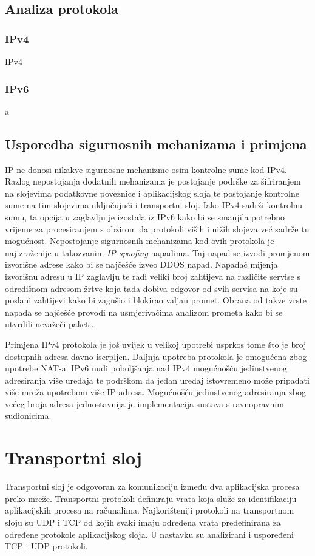 \documentclass[times, utf8, diplomski]{fer}
\begin{document}
\subsection{Analiza protokola}
\subsubsection{IPv4}
IPv4 

\subsubsection{IPv6}
a

\subsection{Usporedba sigurnosnih mehanizama i primjena}
IP ne donosi nikakve sigurnosne mehanizme osim kontrolne sume kod IPv4. Razlog nepostojanja dodatnih mehanizama je postojanje podrške za šifriranjem na slojevima podatkovne poveznice i aplikacijskog sloja te postojanje kontrolne sume na tim slojevima uključujući i transportni sloj. Iako IPv4 sadrži kontrolnu sumu, ta opcija u zaglavlju je izostala iz IPv6 kako bi se smanjila potrebno vrijeme za procesiranjem s obzirom da protokoli viših i nižih slojeva već sadrže tu mogućnost. Nepostojanje sigurnosnih mehanizama kod ovih protokola je najizraženije u takozvanim \emph{IP spoofing} napadima. Taj napad se izvodi promjenom izvorišne adrese kako bi se najčešće izveo DDOS napad. Napadač mijenja izvorišnu adresu u IP zaglavlju te radi veliki broj zahtijeva na različite servise s odredišnom adresom žrtve koja tada dobiva odgovor od svih servisa na koje su poslani zahtijevi kako bi zagušio i blokirao valjan promet. Obrana od takve vrste napada se najčešće provodi na usmjerivačima analizom prometa kako bi se utvrdili nevažeči paketi. 

Primjena IPv4 protokola je još uvijek u velikoj upotrebi usprkos tome što je broj dostupnih adresa davno iscrpljen. Daljnja upotreba protokola je omogućena zbog upotrebe NAT-a. IPv6 nudi poboljšanja nad IPv4 mogućnošću jedinstvenog adresiranja više uređaja te podrškom da jedan uređaj istovremeno može pripadati više mreža upotrebom više IP adresa. Mogućnošću jedinstvenog adresiranja zbog većeg broja adresa jednostavnija je implementacija sustava s ravnopravnim sudionicima.

\section{Transportni sloj}
Transportni sloj je odgovoran za komunikaciju između dva aplikacijska procesa preko mreže. Transportni protokoli definiraju vrata koja služe za identifikaciju aplikacijskih procesa na računalima. Najkorišteniji protokoli na transportnom sloju su UDP i TCP od kojih svaki imaju određena vrata predefinirana za određene protokole aplikacijskog sloja. U nastavku su analizirani i uspoređeni TCP i UDP protokoli.
\end{document}
